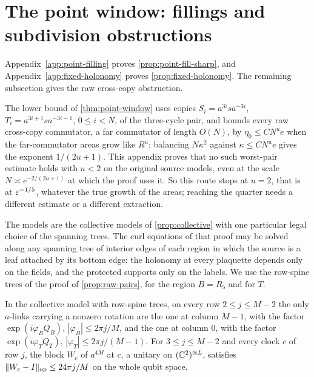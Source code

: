 \section{The point window: fillings and subdivision obstructions}\label{app:window}

Appendix~\ref{app:point-filling} proves \cref{prop:point-fill-sharp}, and Appendix~\ref{app:fixed-holonomy} proves \cref{prop:fixed-holonomy}. The remaining subsection gives the raw cross-copy obstruction.

The lower bound of \cref{thm:point-window} uses copies $S_i=a^{3i}sa^{-3i}$, $T_i=a^{3i+1}sa^{-3i-1}$, $0\le i<N$, of the three-cycle
pair, and bounds every raw cross-copy commutator, a far commutator of length $O(N)$, by $\eta_0\le CN^ue$ when the far-commutator
areas grow like $R^u$; balancing $N\kappa^2$ against $\kappa\le CN^ue$ gives the exponent $1/(2u+1)$. This appendix proves that no
such worst-pair estimate holds with $u<2$ on the original source models, even at the scale $N\asymp e^{-2/(2u+1)}$ at which the proof
uses it. So this route stops at $u=2$, that is at $\varepsilon^{-1/5}$, whatever the true growth of the areas; reaching the quarter needs a
different estimate or a different extraction.

The models are the collective models of \cref{prop:collective} with one particular legal choice of the spanning trees. The curl
equations of that proof may be solved along any spanning tree of interior edges of each region in which the source is a leaf
attached by its bottom edge: the holonomy at every plaquette depends only on the fields, and the protected supports only on the
labels. We use the row-spine trees of the proof of \cref{prop:raw-pairs}, for the region $B=R_5$ and for $T$.

\begin{lemma}\label{lem:window-angles}
In the collective model with row-spine trees, on every row $2\le j\le M-2$ the only $a$-links carrying a nonzero rotation are the one
at column $M-1$, with the factor $\exp(i\varphi_BQ_B)$, $|\varphi_B|\le2\pi j/M$, and the one at column $0$, with the factor
$\exp(i\varphi_TQ_T)$, $|\varphi_T|\le2\pi j/(M-1)$. For $3\le j\le M-2$ and every clock $c$ of row $j$, the block $W_c$ of $a^{4M}$ at $c$,
a unitary on $(\mathbb C^2)^{\otimes L}$, satisfies $\lVert W_c-I\rVert_{\mathrm{op}}\le24\pi j/M$ on the whole qubit space.
\end{lemma}

